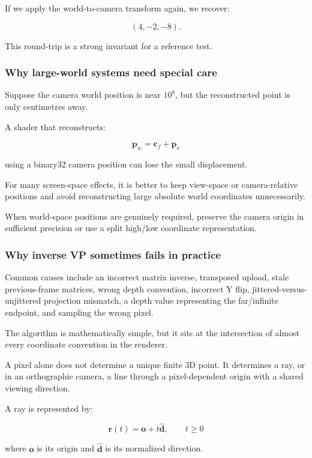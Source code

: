 If we apply the world-to-camera transform again, we recover:

\[ (4,-2,-8). \]

This round-trip is a strong invariant for a reference test.

\subsubsection{Why large-world systems need special care}\label{why-large-world-systems-need-special-care}

Suppose the camera world position is near \(10^8\), but the reconstructed point is only centimetres away.

A shader that reconstructs:

\[ \mathbf p_w=\mathbf c_f+\mathbf p_v \]

using a binary32 camera position can lose the small displacement.

For many screen-space effects, it is better to keep view-space or camera-relative positions and avoid reconstructing large absolute world coordinates unnecessarily.

When world-space positions are genuinely required, preserve the camera origin in sufficient precision or use a split high/low coordinate representation.

\subsubsection{Why inverse VP sometimes fails in practice}\label{why-inverse-vp-sometimes-fails-in-practice}

Common causes include an incorrect matrix inverse, transposed upload, stale previous-frame matrices, wrong depth convention, incorrect Y flip, jittered-versus-unjittered projection mismatch, a depth value representing the far/infinite endpoint, and sampling the wrong pixel.

The algorithm is mathematically simple, but it sits at the intersection of almost every coordinate convention in the renderer.

A pixel alone does not determine a unique finite 3D point. It determines a ray, or in an orthographic camera, a line through a pixel-dependent origin with a shared viewing direction.

A ray is represented by:

\[ \boxed{ \mathbf r(t)=\mathbf o+t\hat{\mathbf d}, \qquad t\ge0 } \]

where \(\mathbf o\) is its origin and \(\hat{\mathbf d}\) is its normalized direction.

